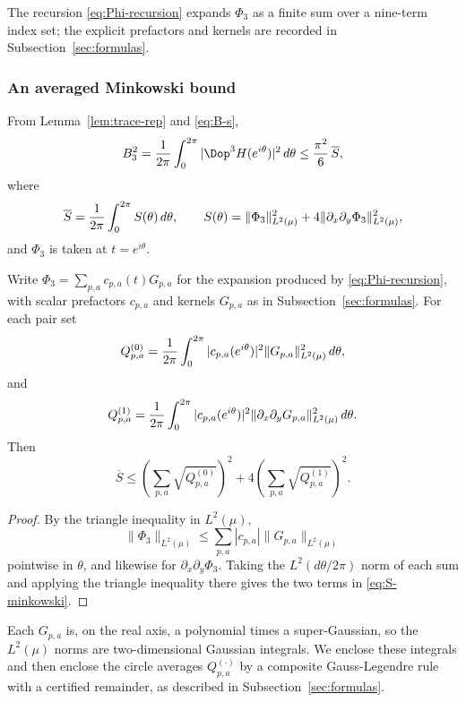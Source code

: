 The recursion \eqref{eq:Phi-recursion} expands $\Phi_3$ as a finite sum over a nine-term index set; the explicit prefactors and kernels are recorded in Subsection~\ref{sec:formulas}.

\subsubsection{An averaged Minkowski bound}

From Lemma~\ref{lem:trace-rep} and \eqref{eq:B-s},
\begin{equation}\label{eq:B3-avg}
  B_3^2={1\over2\pi}\int_0^{2\pi}|\Dop^3H(e^{i\theta})|^2\,d\theta
  \le {\pi^2\over6}\,\overline S,
\end{equation}
where
\[
  \overline S={1\over2\pi}\int_0^{2\pi}S(\theta)\,d\theta,
  \qquad
  S(\theta)=\|\Phi_3\|_{L^2(\mu)}^2+4\|\partial_x\partial_y\Phi_3\|_{L^2(\mu)}^2,
\]
and $\Phi_3$ is taken at $t=e^{i\theta}$.

\begin{lemma}\label{lem:averaged-minkowski}
Write $\Phi_3=\sum_{p,a}c_{p,a}(t)G_{p,a}$ for the expansion produced by \eqref{eq:Phi-recursion}, with scalar prefactors $c_{p,a}$ and kernels $G_{p,a}$ as in Subsection~\ref{sec:formulas}.  For each pair set
\[
  Q^{(0)}_{p,a}={1\over2\pi}\int_0^{2\pi}|c_{p,a}(e^{i\theta})|^2\|G_{p,a}\|_{L^2(\mu)}^2\,d\theta,
\]
and
\[
  Q^{(1)}_{p,a}={1\over2\pi}\int_0^{2\pi}|c_{p,a}(e^{i\theta})|^2\|\partial_x\partial_yG_{p,a}\|_{L^2(\mu)}^2\,d\theta.
\]
Then
\begin{equation}\label{eq:S-minkowski}
  \overline S\le
  \left(\sum_{p,a}\sqrt{Q^{(0)}_{p,a}}\right)^2
  +4\left(\sum_{p,a}\sqrt{Q^{(1)}_{p,a}}\right)^2.
\end{equation}
\end{lemma}

\begin{proof}
By the triangle inequality in $L^2(\mu)$,
\[
  \|\Phi_3\|_{L^2(\mu)}\le\sum_{p,a}|c_{p,a}|\|G_{p,a}\|_{L^2(\mu)}
\]
pointwise in $\theta$, and likewise for $\partial_x\partial_y\Phi_3$.  Taking the $L^2(d\theta/2\pi)$ norm of each sum and applying the triangle inequality there gives the two terms in \eqref{eq:S-minkowski}.
\end{proof}

Each $G_{p,a}$ is, on the real axis, a polynomial times a super-Gaussian, so the $L^2(\mu)$ norms are two-dimensional Gaussian integrals.  We enclose these integrals and then enclose the circle averages $Q^{(\cdot)}_{p,a}$ by a composite Gauss-Legendre rule with a certified remainder, as described in Subsection~\ref{sec:formulas}.

